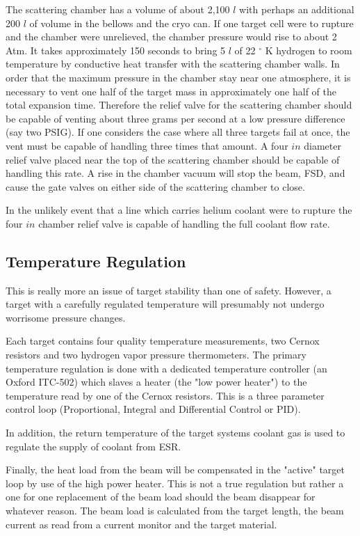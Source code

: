 {The scattering chamber has a volume of about 2,100 $l$ with perhaps an 
additional 200 $l$ of volume in the bellows and the cryo can.
If one target cell were to rupture and the chamber were unrelieved,
the chamber pressure would rise to about 2 Atm.
It takes approximately 150 seconds to
bring 5 $l$ of 22 $^\circ$ K hydrogen to room temperature
by conductive heat transfer with the scattering chamber walls.
In order that the maximum pressure 
in the chamber stay near one atmosphere, it is necessary to
vent one half of the target mass in approximately one half of the
total expansion time. Therefore the relief valve for the scattering chamber
should be capable of venting about three grams per second
at a low pressure difference (say two PSIG).
If one considers the case where all three targets
fail at once, the vent must be capable of handling three times
that amount. A four $in$ diameter relief valve placed near the
top of the scattering chamber should be capable of handling this rate.
A rise in the chamber vacuum will stop the beam, FSD, and
cause the gate valves on either side of the scattering chamber to
close. 

In the unlikely event that a line which carries helium coolant
were to rupture the four $in$ chamber relief valve is capable
of handling the full coolant flow rate.

\subsection{ Temperature Regulation}

This is really more an issue of target stability than one of
safety. However, a target with a carefully regulated temperature
will presumably not undergo worrisome pressure changes.

Each target contains four quality temperature measurements, two Cernox
resistors and two hydrogen vapor pressure thermometers. The primary
temperature regulation is done with a dedicated temperature controller
(an Oxford ITC-502) which slaves a heater (the "low power heater") 
to the temperature read by one of the Cernox resistors.
This is a three parameter control loop (Proportional, Integral and Differential
Control or PID).

In addition, the return temperature of the target systems coolant
gas is used to regulate the supply of coolant from ESR.

Finally, the heat load from the beam will be compensated in the "active"
target loop by use of the high power heater. This is not a true regulation
but rather a one for one replacement of the beam load should the beam
disappear for whatever reason. The beam load is calculated from the
target length, the beam current as read from a current monitor and
the target material.

}
